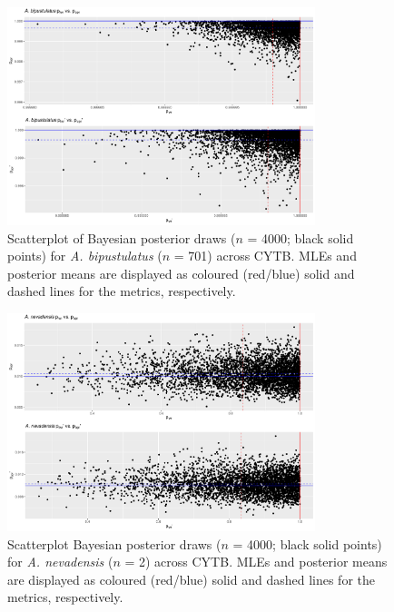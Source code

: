 \documentclass[12pt]{article}
\begin{document}
\begin{figure}[H]

\centering

\includegraphics[width=0.80\textwidth]{Figure 3}

\caption{Scatterplot of Bayesian posterior draws ($n$ = 4000; black solid points) for \textit{A. bipustulatus} ($n$ = 701) across CYTB. MLEs and posterior means are displayed as coloured (red/blue) solid and dashed lines for the metrics, respectively.}

\end{figure}

\newpage


\begin{figure}[H]

\centering

\includegraphics[width=0.80\textwidth]{Figure 4}

\caption{Scatterplot Bayesian posterior draws ($n$ = 4000; black solid points) for \textit{A. nevadensis} ($n$ = 2) across CYTB. MLEs and posterior means are displayed as coloured (red/blue) solid and dashed lines for the metrics, respectively.}

\end{figure}
\end{document}
